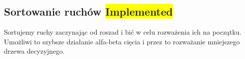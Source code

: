 \subsection{Sortowanie ruchów \colorbox{yellow}{Implemented}}
\label{subsec:sortowanie-ruchow}

{
    \color{red}
    \large Sortujemy ruchy zaczynając od roszad i bić w celu rozważenia ich na początku.
    Umożliwi to szybsze działanie alfa-beta cięcia i przez to rozważanie mniejszego drzewa decyzyjnego.
}